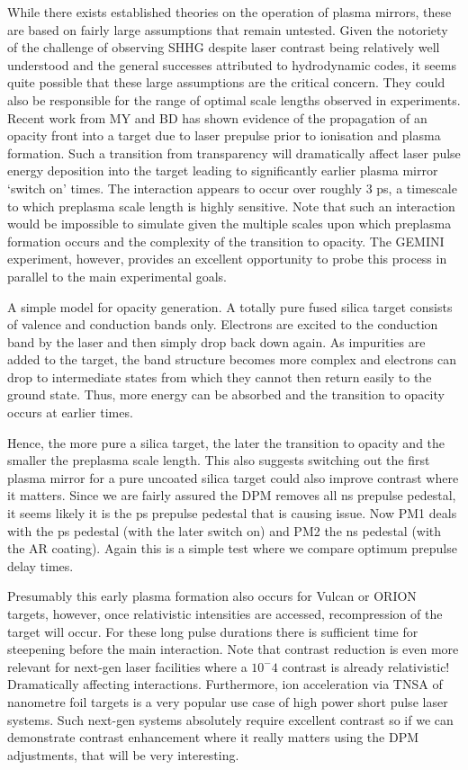 While there exists established theories on the operation of plasma mirrors, these are based on fairly large assumptions that remain untested. Given the notoriety of the challenge of observing SHHG despite laser contrast being relatively well understood and the general successes attributed to hydrodynamic codes, it seems quite possible that these large assumptions are the critical concern. They could also be responsible for the range of optimal scale lengths observed in experiments. Recent work from MY and BD has shown evidence of the propagation of an opacity front into a target due to laser prepulse prior to ionisation and plasma formation. Such a transition from transparency will dramatically affect laser pulse energy deposition into the target leading to significantly earlier plasma mirror `switch on' times. The interaction appears to occur over roughly 3 ps, a timescale to which preplasma scale length is highly sensitive. Note that such an interaction would be impossible to simulate given the multiple scales upon which preplasma formation occurs and the complexity of the transition to opacity. The GEMINI experiment, however, provides an excellent opportunity to probe this process in parallel to the main experimental goals.

A simple model for opacity generation. A totally pure fused silica target consists of valence and conduction bands only. Electrons are excited to the conduction band by the laser and then simply drop back down again. As impurities are added to the target, the band structure becomes more complex and electrons can drop to intermediate states from which they cannot then return easily to the ground state. Thus, more energy can be absorbed and the transition to opacity occurs at earlier times.

Hence, the more pure a silica target, the later the transition to opacity and the smaller the preplasma scale length. This also suggests switching out the first plasma mirror for a pure uncoated silica target could also improve contrast where it matters. Since we are fairly assured the DPM removes all ns prepulse pedestal, it seems likely it is the ps prepulse pedestal that is causing issue. Now PM1 deals with the ps pedestal (with the later switch on) and PM2 the ns pedestal (with the AR coating). Again this is a simple test where we compare optimum prepulse delay times.

Presumably this early plasma formation also occurs for Vulcan or ORION targets, however, once relativistic intensities are accessed, recompression of the target will occur. For these long pulse durations there is sufficient time for steepening before the main interaction. Note that contrast reduction is even more relevant for next-gen laser facilities where a $10^-4$ contrast is already relativistic! Dramatically affecting interactions. Furthermore, ion acceleration via TNSA of nanometre foil targets is a very popular use case of high power short pulse laser systems. Such next-gen systems absolutely require excellent contrast so if we can demonstrate contrast enhancement where it really matters using the DPM adjustments, that will be very interesting.

